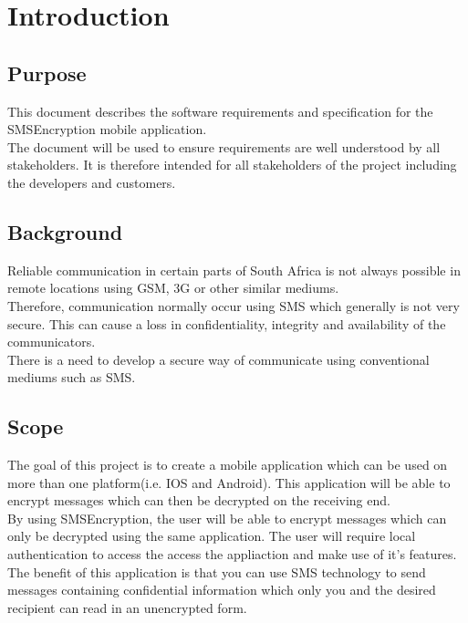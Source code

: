 \section{Introduction}

\subsection{Purpose}%
This document describes the software requirements and specification for the SMSEncryption mobile application.
\vspace{10pt}\\
The document will be used to ensure requirements are well understood by all stakeholders. It is therefore intended for all stakeholders of the project including the developers and customers.


\subsection{Background}
Reliable communication in certain parts of South Africa is not always possible in remote locations using GSM, 3G or other similar mediums.
\vspace{10pt}\\
Therefore, communication normally occur using SMS which generally is not very secure. This can cause a loss in confidentiality, integrity and availability of the communicators.
\vspace{10pt}\\
There is a need to develop a secure way of communicate using conventional mediums such as SMS.

\subsection{Scope}
The goal of this project is to create a mobile application which can be used on more than one platform(i.e. IOS and Android). This application will be able to encrypt messages which can then be decrypted on the receiving end.
\vspace{10pt}\\
By using SMSEncryption, the user will be able to encrypt messages which can only be decrypted using the same application. The user will require local authentication to access the access the appliaction and make use of it's features.
\vspace{10pt}\\
The benefit of this application is that you can use SMS technology to send messages containing confidential information which only you and the desired recipient can read in an unencrypted form.



